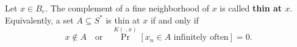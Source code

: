 Let $x \in B_e$. The complement of a fine neighborhood of $x$ is called \textbf{thin at $x$}. Equivalently, a set $A \subseteq S^*$ is thin at $x$ if and only if
\[
x \notin A \quad \text{or} \quad \Pr^{K(\cdot, x)}\left[x_n \in A \text{ infinitely often}\right] = 0.
\]
